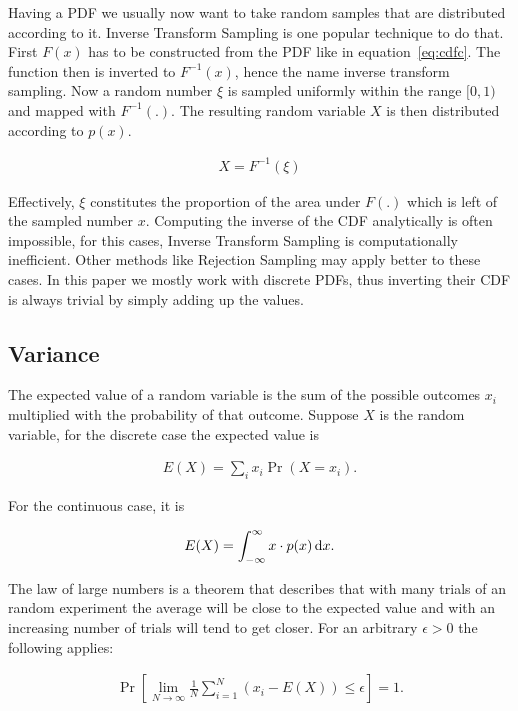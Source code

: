 Having a PDF we usually now want to take random samples that are distributed according to it. Inverse Transform Sampling is one popular technique to do that. First $F(x)$ has to be constructed from the PDF like in equation~\ref{eq:cdfc}. The function then is inverted to $F^{-1}(x)$, hence the name inverse transform sampling. Now a random number $\xi$ is sampled uniformly within the range $[0, 1)$ and mapped with $F^{-1}(.)$. The resulting random variable $X$ is then distributed according to $p(x)$.

\begin{align}
 X = F^{-1}(\xi)
\end{align}

Effectively, $\xi$ constitutes the proportion of the area under $F(.)$ which is left of the sampled number $x$. Computing the inverse of the CDF analytically is often impossible, for this cases, Inverse Transform Sampling is computationally inefficient. Other methods like Rejection Sampling may apply better to these cases. In this paper we mostly work with discrete PDFs, thus inverting their CDF is always trivial by simply adding up the values.

\subsection{Variance}
\label{sec:var}
The expected value of a random variable is the sum of the possible outcomes $x_i$ multiplied with the probability of that outcome. Suppose $X$ is the random variable, for the discrete case the expected value is

\begin{align}
 E(X) = \sum_i x_i \Pr(X = x_i).
\end{align}

For the continuous case, it is 

\begin{align}
 E(X) = \int_{-\infty}^{\infty} x \cdot p(x) \mathop{}\!\mathrm{d} x.
\end{align}

The law of large numbers is a theorem that describes that with many trials of an random experiment the average will be close to the expected value and with an increasing number of trials will tend to get closer. For an arbitrary $\epsilon > 0$ the following applies:

\begin{align}
 \Pr\left[ \lim_{N\rightarrow \infty} \frac{1}{N} \sum_{i=1}^N (x_i - E(X)) \leq \epsilon \right] = 1.
\end{align}


